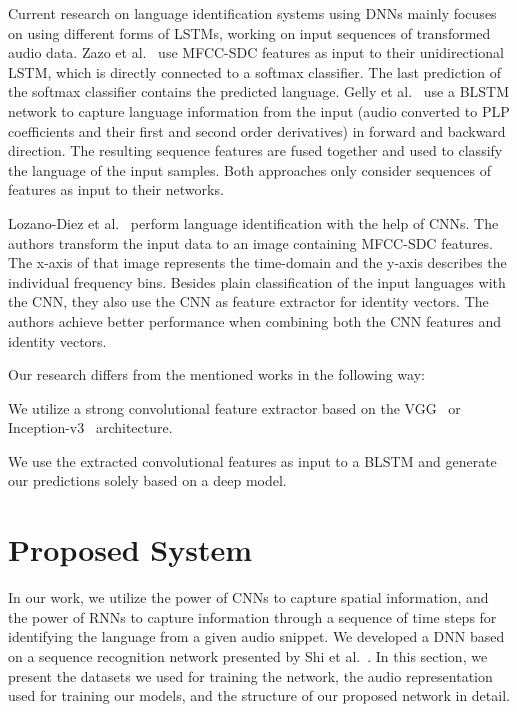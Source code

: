 \documentclass{llncs}
\begin{document}
Current research on language identification systems using \acp{DNN} mainly focuses on using different forms of \acp{LSTM}, working on input sequences of transformed audio data.
Zazo et al.~\cite{Zazo2016Language} use \ac{MFCC-SDC} features as input to their unidirectional \ac{LSTM}, which is directly connected to a softmax classifier. The last prediction of the softmax classifier contains the predicted language.
Gelly et al.~\cite{Gelly2016DivideAndConquer} use a \ac{BLSTM} network to capture language information from the input (audio converted to \ac{PLP} coefficients and their first and second order derivatives) in forward and backward direction. The resulting sequence features are fused together and used to classify the language of the input samples.
Both approaches only consider sequences of features as input to their networks.

Lozano-Diez et al.~\cite{Diez2015EndToEnd} perform language identification with the help of \acp{CNN}.
The authors transform the input data to an image containing \ac{MFCC-SDC} features.
The x-axis of that image represents the time-domain and the y-axis describes the individual frequency bins.
Besides plain classification of the input languages with the \ac{CNN}, they also use the \ac{CNN} as feature extractor for identity vectors.
The authors achieve better performance when combining both the \ac{CNN} features and identity vectors.

Our research differs from the mentioned works in the following way:
\begin{enumerate*}[label={(\arabic*)}]
	\item We utilize a strong convolutional feature extractor based on the VGG~\cite{Simonyan2015Very} or Inception-v3~\cite{Szegedy2016Rethinking} architecture.
	\item We use the extracted convolutional features as input to a \ac{BLSTM} and generate our predictions solely based on a deep model.
\end{enumerate*}




 \section{Proposed System}
\label{sec:proposed_system}

In our work, we utilize the power of \acp{CNN} to capture spatial information, and the power of \acp{RNN} to capture information through a sequence of time steps for identifying the language from a given audio snippet.
We developed a \ac{DNN} based on a sequence recognition network presented by Shi et al.~\cite{Shi2016EndToEnd}.
In this section, we present the datasets we used for training the network, the audio representation used for training our models, and the structure of our proposed network in detail.
\end{document}
